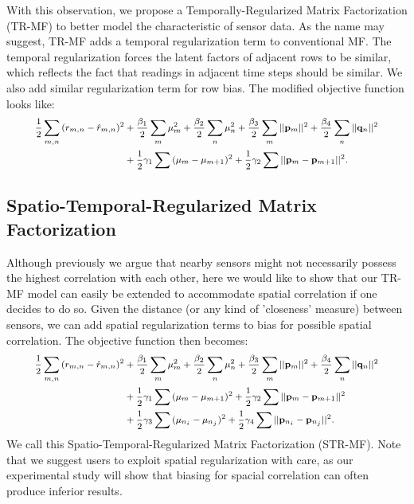 With this observation, we propose a Temporally-Regularized Matrix Factorization (TR-MF) to better model the characteristic of sensor data. As the name may suggest, TR-MF adds a temporal regularization term to conventional MF.
The temporal regularization forces the latent factors of adjacent rows to be similar, which reflects the fact that 
readings in adjacent time steps should be similar. We also add similar regularization term for row bias.
The modified objective function looks like: 
\begin{equation*}\small \begin{aligned}
\frac{1}{2}\sum_{m,n}{(r_{m,n} - \hat{r}_{m,n})}^2 &+ \frac{\beta_1}{2}\sum_m{\mu_m^2} + \frac{\beta_2}{2}\sum_n{\mu_n^2}
+ \frac{\beta_3}{2}\sum_m{||\mathbf{p}_m||^2} + \frac{\beta_4}{2}\sum_n{||\mathbf{q}_n||^2}\\
&+ \frac{1}{2}\gamma_1\sum{(\mu_m-\mu_{m+1})^2} 
+ \frac{1}{2}\gamma_2\sum{||\mathbf{p}_m-\mathbf{p}_{m+1}||^2}.
\end{aligned}\end{equation*}

\subsection{Spatio-Temporal-Regularized Matrix Factorization}
Although previously we argue that nearby sensors might not necessarily possess the highest correlation with each other, 
here we would like to show that our TR-MF model can easily be extended to accommodate spatial correlation if one decides to do so. 
Given the distance (or any kind of 'closeness' measure) between sensors, we can add spatial regularization terms to bias for 
possible spatial correlation.
The objective function then becomes: 
\begin{equation*}\small \begin{aligned}
\frac{1}{2}\sum_{m,n}{(r_{m,n} - \hat{r}_{m,n})}^2& + \frac{\beta_1}{2}\sum_m{\mu_m^2} + \frac{\beta_2}{2}\sum_n{\mu_n^2}
+\frac{\beta_3}{2}\sum_m{||\mathbf{p}_m||^2} + \frac{\beta_4}{2}\sum_n{||\mathbf{q}_n||^2}\\ 
&+\frac{1}{2}\gamma_1\sum{(\mu_m-\mu_{m+1})^2}
+ \frac{1}{2}\gamma_2\sum{||\mathbf{p}_m-\mathbf{p}_{m+1}||^2}\\
&+\frac{1}{2}\gamma_3\sum{(\mu_{n_i}-\mu_{n_j})^2} 
+ \frac{1}{2}\gamma_4\sum{||\mathbf{p}_{n_i}-\mathbf{p}_{n_j}||^2}.
\end{aligned}\end{equation*}
We call this Spatio-Temporal-Regularized Matrix Factorization (STR-MF). Note that we suggest users to exploit spatial 
regularization with care, as our experimental study will show that biasing for spacial correlation can often produce inferior results. 

